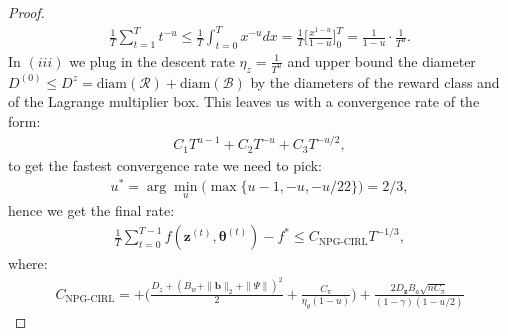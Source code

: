 \begin{proof}
\begin{align*}
    \frac{1}{T}\sum_{t=1}^{T} t^{-u} 
    \leq \frac{1}{T} \int_{t=0}^{T} x^{-u} dx 
    = \frac{1}{T} \Bigg[ \frac{x^{1-u}}{1-u}  \Bigg]^T_0 
    = \frac{1}{1-u}\cdot \frac{1}{T^{u}}.
\end{align*}
In $(iii)$ we plug in the descent rate $\eta_z = \frac{1}{T^u}$ and upper bound the diameter $D^{(0)}\leq D^z = \text{diam}(\mathcal{R}) + \text{diam}(\mathcal{B})$ by the diameters of the reward class and of the Lagrange multiplier box. This leaves us with a convergence rate of the form:
\begin{align*}
    C_1 T^{u-1} + C_2 T^{-u} + C_3 T^{-u/2},
\end{align*}
to get the fastest convergence rate we need to pick:
\begin{align*}
    u^* =\arg \min_u \Big( \max \big\lbrace u-1,-u,-{u}/2{2} \big\rbrace \Big) = 2/3,
\end{align*}
hence we get the final rate:
\begin{align*}
    \frac{1}{T} \sum_{t=0}^{T-1} f(\bm{z}^{(t)},\bm{\theta}^{(t)}) - f^* \leq
    C_\text{NPG-CIRL} T^{-1/3},
\end{align*}
where:
\begin{align*}
    C_\text{NPG-CIRL} =
    +\Bigg(\frac{D_z+(B_w + \|\bm{b}\|_2 + \|\Psi\|)^2}{2} 
    + \frac{C_\pi}{\eta_\theta(1-u)}\Bigg)
    + \frac{2 D_{\bm{z}} B_a\sqrt{n C_\pi}}{(1 - \gamma)(1-u/2)}
\end{align*}
\end{proof}